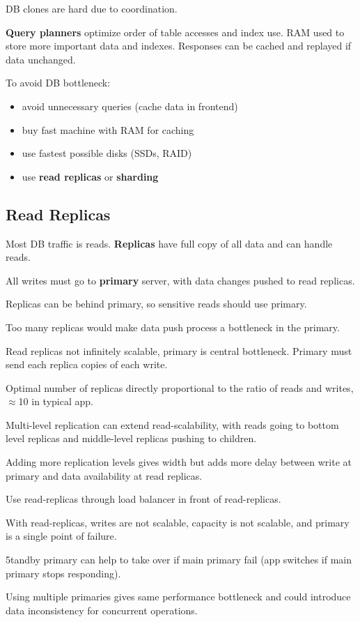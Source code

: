 \documentclass[11pt]{article}
\begin{document}
DB clones are hard due to coordination.

\textbf{Query planners} optimize order of table accesses and index use.
RAM used to store more important data and indexes.
Responses can be cached and replayed if data unchanged.

To avoid DB bottleneck:
\begin{itemize}
\item avoid unnecessary queries (cache data in frontend)
\item buy fast machine with RAM for caching
\item use fastest possible disks (SSDs, RAID)
\item use \textbf{read replicas} or \textbf{sharding}
\end{itemize}
\subsection{Read Replicas}
\label{sec:orgda49051}
Most DB traffic is reads.
\textbf{Replicas} have full copy of all data and can handle reads.

All writes must go to \textbf{primary} server, with data changes pushed to read replicas.

Replicas can be behind primary, so sensitive reads should use primary.

Too many replicas would make data push process a bottleneck in the primary.

Read replicas not infinitely scalable, primary is central bottleneck.
Primary must send each replica copies of each write.

Optimal number of replicas directly proportional to the ratio of reads and writes, \(\approx\)10 in
typical app.

Multi-level replication can extend read-scalability, with reads going to bottom level replicas
and middle-level replicas pushing to children.

Adding more replication levels gives width but adds more delay between write at primary and
data availability at read replicas.

Use read-replicas through load balancer in front of read-replicas.

With read-replicas, writes are not scalable, capacity is not scalable, and primary is a single
point of failure.

5tandby primary can help to take over if main primary fail (app switches if main primary stops
responding).

Using multiple primaries gives same performance bottleneck and could introduce data inconsistency
for concurrent operations.
\end{document}
